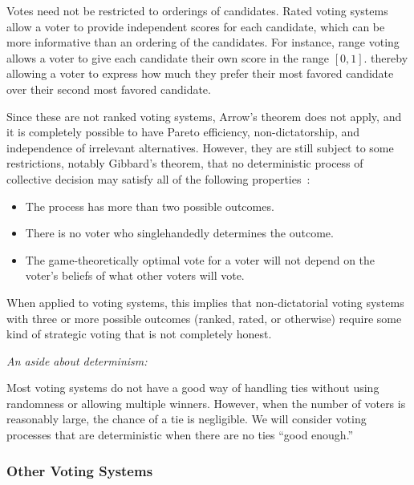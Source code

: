 \documentclass[11pt]{article}
\begin{document}
    Votes need not be restricted to orderings of candidates.
    Rated voting systems allow a voter to provide independent scores for each candidate,
    which can be more informative than an ordering of the candidates.
    For instance, range voting allows a voter to give each candidate their own score in the range $[0, 1]$.
    thereby allowing a voter to express how much they prefer their most favored candidate
    over their second most favored candidate.

    Since these are not ranked voting systems, Arrow's theorem does not apply,
    and it is completely possible to have Pareto efficiency,
    non-dictatorship, and independence of irrelevant alternatives.
    However, they are still subject to some restrictions, notably Gibbard's theorem,
    that no deterministic process of collective decision may satisfy all of the following properties~\cite{Gibbard}:

    \begin{itemize}
        \item The process has more than two possible outcomes.
        \item There is no voter who singlehandedly determines the outcome.
        \item The game-theoretically optimal vote for a voter will not depend on
        the voter's beliefs of what other voters will vote.
    \end{itemize}

    When applied to voting systems, this implies that non-dictatorial voting systems
    with three or more possible outcomes (ranked, rated, or otherwise)
    require some kind of strategic voting that is not completely honest.

    \begin{leftbar}
        \textit{An aside about determinism:}

        Most voting systems do not have a good way of handling ties without
        using randomness or allowing multiple winners.
        However, when the number of voters is reasonably large, the chance of a tie is negligible.
        We will consider voting processes that are deterministic when there are no ties ``good enough.''
    \end{leftbar}

    \subsubsection{Other Voting Systems}
\end{document}
